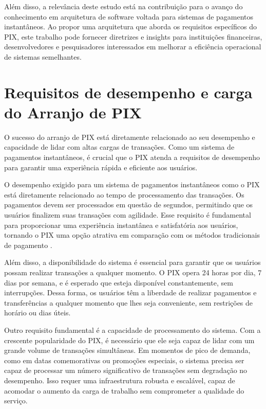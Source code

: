 \documentclass[12pt]{article}
\begin{document}
Além disso, a relevância deste estudo está na contribuição para o avanço do conhecimento em arquitetura de software voltada para sistemas de pagamentos instantâneos. Ao propor uma arquitetura que aborda os requisitos específicos do PIX, este trabalho pode fornecer diretrizes e insights para instituições financeiras, desenvolvedores e pesquisadores interessados em melhorar a eficiência operacional de sistemas semelhantes.

\section{Requisitos de desempenho e carga do Arranjo de PIX} \label{sec:requisitos}

O sucesso do arranjo de PIX está diretamente relacionado ao seu desempenho e capacidade de lidar com altas cargas de transações. Como um sistema de pagamentos instantâneos, é crucial que o PIX atenda a requisitos de desempenho para garantir uma experiência rápida e eficiente aos usuários.

O desempenho exigido para um sistema de pagamentos instantâneos como o PIX está diretamente relacionado ao tempo de processamento das transações. Os pagamentos devem ser processados em questão de segundos, permitindo que os usuários finalizem suas transações com agilidade. Esse requisito é fundamental para proporcionar uma experiência instantânea e satisfatória aos usuários, tornando o PIX uma opção atrativa em comparação com os métodos tradicionais de pagamento .

Além disso, a disponibilidade do sistema é essencial para garantir que os usuários possam realizar transações a qualquer momento. O PIX opera 24 horas por dia, 7 dias por semana, e é esperado que esteja disponível constantemente, sem interrupções. Dessa forma, os usuários têm a liberdade de realizar pagamentos e transferências a qualquer momento que lhes seja conveniente, sem restrições de horário ou dias úteis.

Outro requisito fundamental é a capacidade de processamento do sistema. Com a crescente popularidade do PIX, é necessário que ele seja capaz de lidar com um grande volume de transações simultâneas. Em momentos de pico de demanda, como em datas comemorativas ou promoções especiais, o sistema precisa ser capaz de processar um número significativo de transações sem degradação no desempenho. Isso requer uma infraestrutura robusta e escalável, capaz de acomodar o aumento da carga de trabalho sem comprometer a qualidade do serviço.
\end{document}
